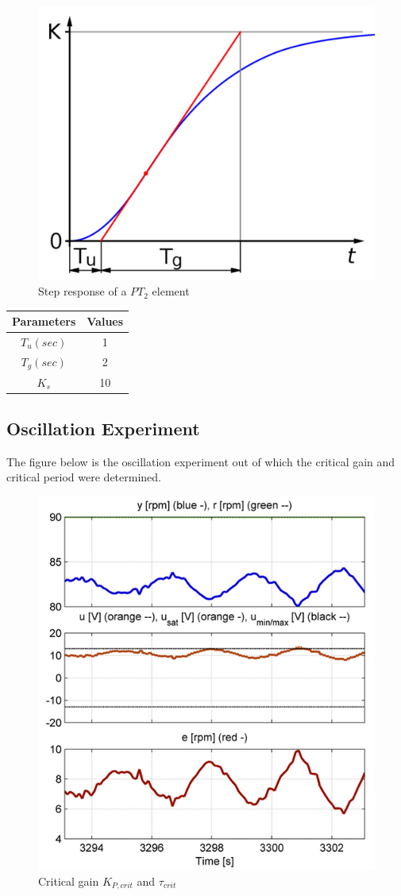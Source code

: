 \begin{figure}[H]
\begin{center}
\includegraphics[width=0.6\linewidth]{images/general/wendetangentenverfahren}
\end{center}
\caption{Step response of a $PT_2$ element}
\label{fig:wendetangentenverfahren}
\end{figure}

\begin{center}
\begin{tabular}{ |c|c| } 
 \hline
 Parameters & Values \\ \hline
 $T_{u}(sec)$ & 1   \\  
 \hline
 $T_{g}(sec)$ & 2  \\ \hline
 $K_{s}$ & 10 \\ \hline
\end{tabular}
\end{center}


\subsection{Oscillation Experiment}
The figure below is the oscillation experiment out of which the critical gain and critical period were determined.
\begin{figure}[H]
\begin{center}
\includegraphics[width=0.6\linewidth]{images/general/Oscillation_Experiment}
\end{center}
\caption{Critical gain $K_{P,crit}$ and $\tau_{crit} $}
\label{fig:Oscillation_Experiment}
\end{figure}
